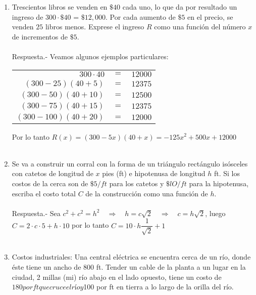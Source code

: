 \begin{enumerate}
    \item Trescientos libros se venden en $\$ 40$ cada uno, lo que da por resultado un ingreso de $300\cdot \$ 40 $ = $\$12,000$. Por cada aumento de $\$ 5$ en el precio, se venden $25$ libros menos. Exprese el ingreso $R$ como una función del número $x$ de incrementos de $\$5$.\\\\
	Respuesta.-\; Veamos algunos ejemplos particulares:
	\begin{center}
	    \begin{tabular}{rcl}
		$300\cdot 40$&$=$&$12000$\\
		$(300 - 25)(40 + 5)$&$=$&$12375$\\
		$(300 - 50)(40 + 10)$&$=$&$12500$\\
		$(300 - 75)(40 + 15)$&$=$&$12375$\\
		$(300 - 100)(40 + 20)$&$=$&$12000$\\
	    \end{tabular}
	\end{center}
	Por lo tanto $R(x)=(300-5x)(40+x)=-125x^2 + 500x + 12000$\\\\

    \item Se va a construir un corral con la forma de un triángulo rectángulo isósceles con catetos de longitud de $x$ pies (ft) e hipotenusa de longitud $h$ ft. Si los costos de la cerca son de $\$ 5 / ft$ para los catetos y $\$ lO/ft$ para la hipotenusa, escriba el costo total $C$ de la construcción como una función de $h$.\\\\
	Respuesta.-\; Sea $c^2+c^2=h^2 \quad \Rightarrow \quad h=c \sqrt{2} \quad \Rightarrow \quad c=h \sqrt{2}$, luego $C=2\cdot c \cdot 5 + h \cdot 10$ por lo tanto $C=10\cdot h \dfrac{1}{\sqrt{2}} + 1$\\\\

    \item Costos industriales: Una central eléctrica se encuentra cerca de un río, donde éste tiene un ancho de 800 ft. Tender un cable de la planta a un lugar en la ciudad, 2 millas (mi) río abajo en el lado opuesto, tiene un costo de $180 por ft que cruce el río y $100 por ft en tierra a lo largo de la orilla del río.
    \begin{enumerate}[\bfseries a.]


\end{enumerate}
\end{enumerate}
